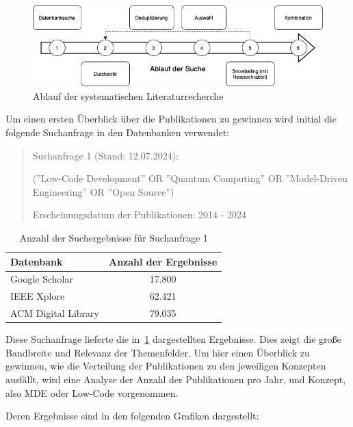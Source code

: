 \begin{figure}[h!]
    \centering
    \includegraphics[width=1\textwidth]{graphics/ablauf_der_suche.png}
    \caption{Ablauf der systematischen Literaturrecherche}
    \label{fig:search_process}
\end{figure}

Um einen ersten Überblick über die Publikationen zu gewinnen wird initial die folgende Suchanfrage in den Datenbanken verwendet:

\begin{quote}
    Suchanfrage 1 (Stand: 12.07.2024):

    (''Low-Code Development'' OR ''Quantum Computing'' OR ''Model-Driven Engineering'' OR ''Open Source'')

    Erscheinungsdatum der Publikationen: 2014 - 2024
\end{quote}

\begin{table}[h!]
    \centering
    \caption{Anzahl der Suchergebnisse für Suchanfrage 1}
    \label{tab:search_1_results}
    \begin{tabular}{|l|c|}
    \hline
    \textbf{Datenbank} & \textbf{Anzahl der Ergebnisse} \\ \hline
    Google Scholar & 17.800 \\ \hline
    IEEE Xplore & 62.421 \\ \hline
    ACM Digital Library & 79.035 \\ \hline
    \end{tabular}
\end{table}
    
Diese Suchanfrage lieferte die in~\ref{tab:search_1_results} dargestellten Ergebnisse. Dies 
zeigt die große Bandbreite und Relevanz der Themenfelder. 
Um hier einen Überblick zu gewinnen, wie die Verteilung der Publikationen zu den jeweiligen Konzepten ausfällt, 
wird eine Analyse der Anzahl der Publikationen pro Jahr, und Konzept, also MDE oder Low-Code vorgenommen.

Deren Ergebnisse sind in den folgenden Grafiken dargestellt:

